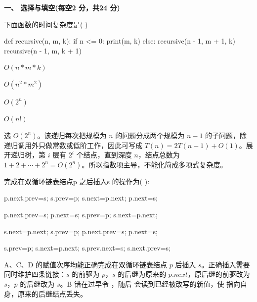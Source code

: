 

\textbf{一、 选择与填空(每空2 分，共24 分)}
\begin{question}
下面函数的时间复杂度是(    )\\
\begin{pycode}
def recursive(n, m, k):
    if n <= 0:
        print(m, k)
    else:
        recursive(n - 1, m + 1, k)
        recursive(n - 1, m, k + 1)
\end{pycode}
\begin{choiceoptions}[2]
  \item $O(n*m*k)$
  \item $O(n^2*m^2)$
  \item $O(2^n)$
  \item $O(n!)$
\end{choiceoptions}
\begin{solution}
选 $O(2^n)$。该递归每次把规模为 $n$ 的问题分成两个规模为 $n-1$ 的子问题，除递归调用外只做常数或低阶工作，因此可写成 $T(n)=2T(n-1)+O(1)$。展开递归树，第 $i$ 层有 $2^i$ 个结点，直到深度 $n$，结点总数为 $1+2+\cdots+2^n=O(2^n)$。所以指数项主导，不能化简成多项式复杂度。
\end{solution}
\end{question}

\begin{question}
完成在双循环链表结点p 之后插入s 的操作为(       ):\\
\begin{choiceoptions}[2]
  \item p.next.prev=s; s.prev=p; s.next=p.next; p.next=s;
  \item p.next.prev=s; p.next=s; s.prev=p; s.next=p.next;
  \item s.next=p.next; s.prev=p; p.next.prev=s; p.next=s;
  \item s.prev=p; s.next=p.next; s.prev.next=s; s.next.prev=s;
\end{choiceoptions}
\begin{solution}
A、C、D 的赋值次序均能正确完成在双循环链表结点 $p$ 后插入 $s$。正确插入需要同时维护四条链接：$s$ 的前驱为 $p$，$s$ 的后继为原来的 $p.next$，原后继的前驱改为 $s$，$p$ 的后继改为 $s$。B 错在过早令 \texttt{}，随后 \texttt{} 会读到已经被改写的新值，使 \texttt{} 指向自身，原来的后继结点丢失。
\end{solution}
\end{question}

